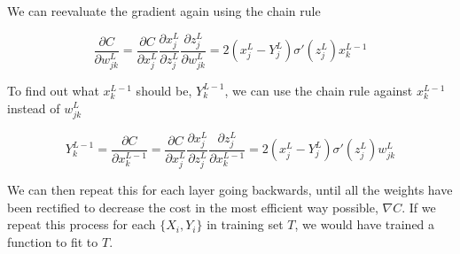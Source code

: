 We can reevaluate the gradient again using the chain rule 

\begin{equation}
\frac{\partial C}{\partial w_{jk}^L}=\frac{\partial C}{\partial x^L_j}\frac{\partial x^L_j}{\partial z^L_j}\frac{\partial z^L_j}{\partial w_{jk}^L}=2(x_{j}^{L}-Y^L_j)\sigma'(z^L_j)x^{L-1}_k
\label{eq:gcrw}
\end{equation}

To find out what $x^{L-1}_k$ should be, $Y^{L-1}_k$, we can use the chain rule against $x^{L-1}_k$ instead of $w_{jk}^L$

\begin{equation}
Y^{L-1}_k=\frac{\partial C}{\partial x^{L-1}_k}=\frac{\partial C}{\partial x^L_j}\frac{\partial x^L_j}{\partial z^L_j}\frac{\partial z^L_j}{\partial x^{L-1}_k}=2(x_{j}^{L}-Y^L_j)\sigma'(z^L_j)w_{jk}^L
\label{eq:gcrY}
\end{equation}

We can then repeat this for each layer going backwards, until all the weights have been rectified to decrease the cost in the most efficient way possible, $\nabla C$. If we repeat this process for each $\{X_i,Y_i\}$ in training set $T$, we would have trained a function to fit to $T$.